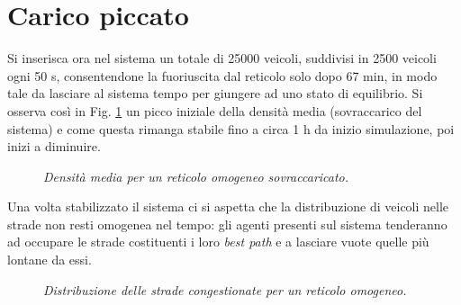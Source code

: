 \documentclass[../main.tex]{subfiles}
\begin{document}
\section{Carico piccato}
Si inserisca ora nel sistema un totale di 25000 veicoli, suddivisi in 2500 veicoli ogni 50 s, consentendone la fuoriuscita dal reticolo solo dopo 67 min, in modo tale da lasciare al sistema tempo per giungere ad uno stato di equilibrio.
Si osserva cos\`i in Fig. \ref{fig:peaked_homo} un picco iniziale della densit\`a media (sovraccarico del sistema) e come questa rimanga stabile fino a circa 1 h da inizio simulazione, poi inizi a diminuire.
\begin{figure}[H]
    \centering
    \caption[Densit\`a media per un reticolo omogeneo sovraccaricato]{\emph{Densit\`a media per un reticolo omogeneo sovraccaricato.}}
    \label{fig:peaked_homo}
\end{figure}
Una volta stabilizzato il sistema ci si aspetta che la distribuzione di veicoli nelle strade non resti omogenea nel tempo: gli agenti presenti sul sistema tenderanno ad occupare le strade costituenti i loro \emph{best path} e a lasciare vuote quelle pi\`u lontane da essi.
\begin{figure}[H]
    \centering
    \caption[Distribuzione delle strade congestionate per un reticolo omogeneo.]{\emph{Distribuzione delle strade congestionate per un reticolo omogeneo.}}
    \label{fig:nStreet_density_peaked_homo}
\end{figure}
\end{document}
